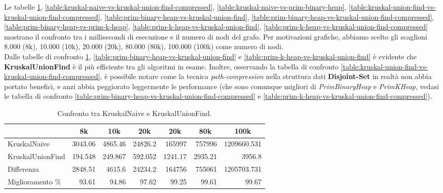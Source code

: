 \noindent Le tabelle \ref{table:kruskal-naive-vs-kruskal-union-find}, \ref{table:kruskal-naive-vs-kruskal-union-find-compressed}, \ref{table:kruskal-naive-vs-prim-binary-heap}, \ref{table:kruskal-union-find-vs-kruskal-union-find-compressed}, \ref{table:prim-binary-heap-vs-kruskal-union-find}, \ref{table:prim-binary-heap-vs-kruskal-union-find-compressed}, \ref{table:prim-binary-heap-vs-prim-k-heap}, \ref{table:prim-k-heap-vs-kruskal-union-find}, \ref{table:prim-k-heap-vs-kruskal-union-find-compressed} mostrano il confronto tra i millisecondi di esecuzione e il numero di nodi del grafo. Per motivazioni grafiche, abbiamo scelto gli scaglioni 8.000 (8k), 10.000 (10k), 20.000 (20k), 80.000 (80k), 100.000 (100k) come numero di nodi. \\

\noindent Dalle tabelle di confronto \ref{table:kruskal-naive-vs-kruskal-union-find}, \ref{table:prim-binary-heap-vs-kruskal-union-find} e \ref{table:prim-k-heap-vs-kruskal-union-find} è evidente che \textbf{KruskalUnionFind} è il più efficiente tra gli algoritmi in esame. Inoltre, osservando la tabella di confronto \ref{table:kruskal-union-find-vs-kruskal-union-find-compressed}, è possibile notare come la tecnica \textit{path-compression} nella struttura dati \textbf{Disjoint-Set} in realtà non abbia portato benefici, e anzi abbia peggiorato leggermente le performance (che sono comunque migliori di \textit{PrimBinaryHeap} e \textit{PrimKHeap}, vedasi le tabella di confronto \ref{table:prim-binary-heap-vs-kruskal-union-find-compressed} e \ref{table:prim-k-heap-vs-kruskal-union-find-compressed}). \\

\begin{table}[H]
\centering
    \begin{tabular}{|l|rrrrrr|}
    \hline
    &  \multicolumn{1}{c}{8k} & \multicolumn{1}{c}{10k} & \multicolumn{1}{c}{20k} & \multicolumn{1}{c}{20k} & \multicolumn{1}{c}{80k} &           \multicolumn{1}{c|}{100k} \\
    \hline
     KruskalNaive     & 3043.06  & 4865.46  & 24826.2   & 165997    & 757996    &    1209660.531 \\
     KruskalUnionFind &  194.548 &  249.867 &   592.052 &   1241.17 &   2935.21 & 3956.8         \\ \hline
     Differenza       & 2848.51  & 4615.6   & 24234.2   & 164756    & 755061    &    1205703.731  \\
     Miglioramento \%  &   93.61  &   94.86  &    97.62  &     99.25 &     99.61 &   99.67           \\
    \hline
    \end{tabular}
    \caption{Confronto tra KruskalNaive e KruskalUnionFind.}
    \label{table:kruskal-naive-vs-kruskal-union-find}
\end{table}

